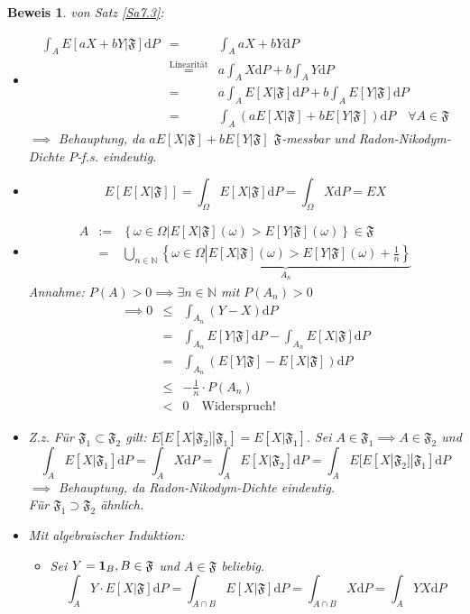\documentclass[a4paper,11pt]{book}
\newcommand{\N}{{\mathbb N}}
\newcommand{\ind}{\text{\bf{1}}}
\def\FF{ \mathfrak{F} }
\def\folgt{\ensuremath{\implies}}
\def\d{\mbox{d}}
\theoremstyle{nonumberplain}
\newtheorem{Bew}{Beweis}
\begin{document}

\begin{Bew} von Satz \ref{Sa7.3}:
\begin{itemize}
\item[a)]
\begin{eqnarray*}
\int_A E[aX+bY|\FF]\d P &=& \int_A aX+bY\d P \\
&\stackrel{\text{Linearität}}{=}& a\int_A X\d P + b\int_A Y\d P \\
&=& a\int_A E[X|\FF]\d P + b\int_A E[Y|\FF]\d P \\
&=& \int_A \left(aE[X|\FF] + bE[Y|\FF]\right)\d P \quad\forall A\in\FF
\end{eqnarray*}
$\folgt$ Behauptung, da $aE[X|\FF] + bE[Y|\FF]$ $\FF$-messbar und Radon-Nikodym-Dichte $P$-f.s. eindeutig.
\item[b)]
$$E[E[X|\FF]] = \int_\Omega E[X|\FF]\d P = \int_\Omega X\d P = EX$$
\item[c)]
\begin{eqnarray*}
A&:=&\left\{\omega\in\Omega\left| E[X|\FF](\omega)>E[Y|\FF](\omega)\right.\right\}\in\FF\\
&=& \bigcup_{n\in\N}\underbrace{\left\{\omega\in\Omega\left|E[X|\FF](\omega)>E[Y|\FF](\omega)+\frac 1 n\right.\right\}}_{A_n}
\end{eqnarray*}
Annahme: $P(A)>0 \folgt\exists n\in\N$ mit $P(A_n) > 0$
\begin{eqnarray*}
\folgt 0 &\le& \int_{A_n}(Y-X)\d P\\
&=&\int_{A_n}E[Y|\FF]\d P - \int_{A_n} E[X|\FF]\d P \\
&=&\int_{A_n}\left(E[Y|\FF]-E[X|\FF]\right)\d P\\
&\le& -\frac 1 n \cdot P(A_n)\\
&<& 0 \quad\text{Widerspruch!}
\end{eqnarray*}
\item[d)] Z.z. Für $\FF_1\subset\FF_2$ gilt: $E[E[X|\FF_2]|\FF_1] = E[X|\FF_1].$ Sei $A\in\FF_1\folgt A\in\FF_2$ und
$$\int_A E[X|\FF_1]\d P = \int_A X\d P = \int_A E[X|\FF_2]\d P = \int_A E[E[X|\FF_2]|\FF_1] \d P$$
$\folgt$ Behauptung, da Radon-Nikodym-Dichte eindeutig.\\
Für $\FF_1\supset\FF_2$ ähnlich.
\item[e)] Mit algebraischer Induktion:
\begin{itemize}
\item Sei $Y = \ind_B, B\in\FF$ und $A\in\FF$ beliebig.
$$\int_A Y\cdot E[X|\FF]\d P = \int_{A\cap B} E[X|\FF]\d P = \int_{A\cap B} X\d P = \int_A YX\d P$$

\end{itemize}
\end{itemize}
\end{Bew}
\end{document}
